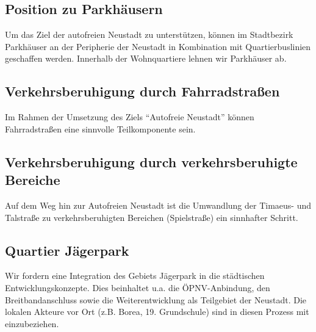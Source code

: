 \documentclass[a4paper, 11pt]{article}
\begin{document}
%


\subsection{Position zu Parkhäusern}

Um das Ziel der autofreien Neustadt zu unterstützen, können im Stadtbezirk Parkhäuser an der Peripherie der Neustadt in Kombination mit Quartierbuslinien geschaffen werden. Innerhalb der Wohnquartiere lehnen wir Parkhäuser ab.



\subsection{Verkehrsberuhigung durch Fahrradstraßen}

Im Rahmen der Umsetzung des Ziels ``Autofreie Neustadt'' können Fahrradstraßen eine sinnvolle Teilkomponente sein.


\subsection{Verkehrsberuhigung durch verkehrsberuhigte Bereiche}

Auf dem Weg hin zur Autofreien Neustadt ist die Umwandlung der Timaeus- und Talstraße zu verkehrsberuhigten Bereichen (Spielstraße) ein sinnhafter Schritt.

\subsection{Quartier Jägerpark}
Wir fordern eine Integration des Gebiets Jägerpark in die städtischen Entwicklungskonzepte. Dies beinhaltet u.a. die ÖPNV-Anbindung, den Breitbandanschluss sowie die Weiterentwicklung als Teilgebiet der Neustadt. Die lokalen Akteure vor Ort (z.B. Borea, 19. Grundschule) sind in diesen Prozess mit einzubeziehen.
\end{document}

